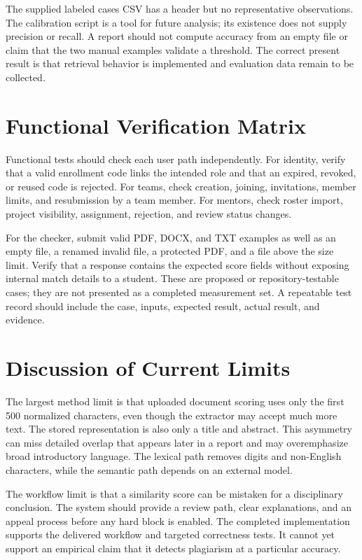 \documentclass[12pt,a4paper]{report}
\begin{document}
The supplied labeled cases CSV has a header but no representative observations. The calibration script is a tool for future analysis; its existence does not supply precision or recall. A report should not compute accuracy from an empty file or claim that the two manual examples validate a threshold. The correct present result is that retrieval behavior is implemented and evaluation data remain to be collected.

\section{Functional Verification Matrix}
Functional tests should check each user path independently. For identity, verify that a valid enrollment code links the intended role and that an expired, revoked, or reused code is rejected. For teams, check creation, joining, invitations, member limits, and resubmission by a team member. For mentors, check roster import, project visibility, assignment, rejection, and review status changes.

For the checker, submit valid PDF, DOCX, and TXT examples as well as an empty file, a renamed invalid file, a protected PDF, and a file above the size limit. Verify that a response contains the expected score fields without exposing internal match details to a student. These are proposed or repository-testable cases; they are not presented as a completed measurement set. A repeatable test record should include the case, inputs, expected result, actual result, and evidence.

\section{Discussion of Current Limits}
The largest method limit is that uploaded document scoring uses only the first 500 normalized characters, even though the extractor may accept much more text. The stored representation is also only a title and abstract. This asymmetry can miss detailed overlap that appears later in a report and may overemphasize broad introductory language. The lexical path removes digits and non-English characters, while the semantic path depends on an external model.

The workflow limit is that a similarity score can be mistaken for a disciplinary conclusion. The system should provide a review path, clear explanations, and an appeal process before any hard block is enabled. The completed implementation supports the delivered workflow and targeted correctness tests. It cannot yet support an empirical claim that it detects plagiarism at a particular accuracy.
\end{document}
